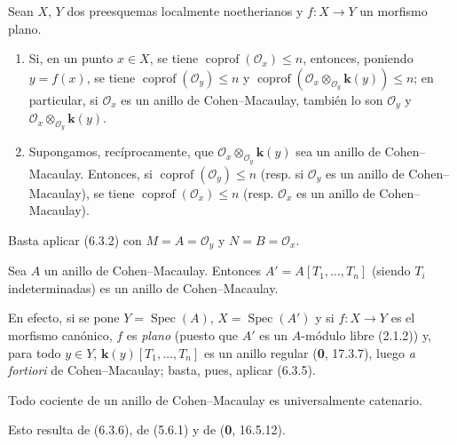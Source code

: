 \begin{corollary}[6.3.5]
\label{IV.2.s6.3.5-fr}
Sean $X$, $Y$ dos preesquemas localmente noetherianos y $f:X\to Y$ un
morfismo plano.
\begin{enumerate}
\item[\textup{(i)}] Si, en un punto $x\in X$, se tiene
$\operatorname{coprof}(\mathcal O_x)\leq n$, entonces, poniendo $y=f(x)$, se
tiene $\operatorname{coprof}(\mathcal O_y)\leq n$ y
$\operatorname{coprof}(\mathcal O_x\otimes_{\mathcal O_y}\boldsymbol{k}(y))\leq n$; en
particular, si $\mathcal O_x$ es un anillo de Cohen--Macaulay, también lo son
$\mathcal O_y$ y $\mathcal O_x\otimes_{\mathcal O_y}\boldsymbol{k}(y)$.
\item[\textup{(ii)}] Supongamos, recíprocamente, que
$\mathcal O_x\otimes_{\mathcal O_y}\boldsymbol{k}(y)$ sea un anillo de Cohen--Macaulay.
Entonces, si $\operatorname{coprof}(\mathcal O_y)\leq n$ \textup{(resp.} si
$\mathcal O_y$ es un anillo de Cohen--Macaulay), se tiene
$\operatorname{coprof}(\mathcal O_x)\leq n$ \textup{(resp.} $\mathcal O_x$ es un
anillo de Cohen--Macaulay).
\end{enumerate}
\end{corollary}

Basta aplicar (6.3.2) con $M=A=\mathcal O_y$ y $N=B=\mathcal O_x$.

\begin{corollary}[6.3.6]
\label{IV.2.s6.3.6-fr}
Sea $A$ un anillo de Cohen--Macaulay. Entonces
$A'=A[T_1,\ldots,T_n]$ (siendo $T_i$ indeterminadas) es un anillo de
Cohen--Macaulay.
\end{corollary}

En efecto, si se pone $Y=\operatorname{Spec}(A)$,
$X=\operatorname{Spec}(A')$ y si $f:X\to Y$ es el morfismo canónico, $f$ es
\emph{plano} (puesto que $A'$ es un $A$-módulo libre (2.1.2)) y, para todo $y\in Y$,
$\boldsymbol{k}(y)[T_1,\ldots,T_n]$ es un anillo regular (\textbf 0, 17.3.7), luego \emph{a
fortiori} de Cohen--Macaulay; basta, pues, aplicar (6.3.5).

\begin{corollary}[6.3.7]
\label{IV.2.s6.3.7-fr}
Todo cociente de un anillo de Cohen--Macaulay es universalmente catenario.
\end{corollary}

Esto resulta de (6.3.6), de (5.6.1) y de (\textbf 0, 16.5.12).
